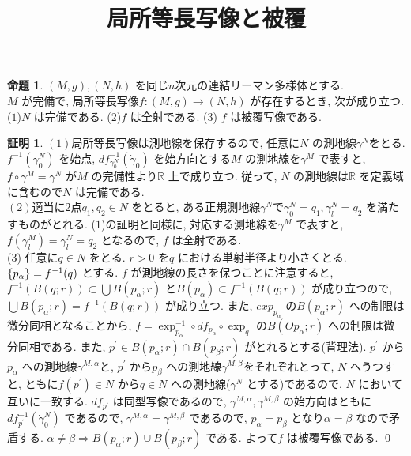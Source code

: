\documentclass[10pt, fleqn, label-section=none]{bxjsarticle}
\title{局所等長写像と被覆}
\date{}
\author{}
\theoremstyle{definition}
\newtheorem{prop}[dfn]{命題}
\newtheorem*{pf*}{証明}
\newcommand{\cbra}[1]{\mleft\{#1\mright\}}
\newcommand{\naraba}{\Rightarrow}
\renewcommand{\;}{\, ; \,}
\begin{document}
\maketitle

\maketitle


\section{}

\begin{prop}
$(M,g), (N,h)$ を同じ$n$次元の連結リーマン多様体とする. \\$M$ が完備で, 局所等長写像$f: (M,g) \rightarrow (N,h)$ が存在するとき, 次が成り立つ.\\
($1$)$N$ は完備である. \quad 
($2$)$f$ は全射である. \quad ($3$) $f$ は被覆写像である.
\end{prop}
\begin{pf*}
$(1)$局所等長写像は測地線を保存するので, 任意に$N$ の測地線$\gamma^N$をとる. $f^{-1}(\gamma^N_0)$ を始点, $df^{-1}_{\gamma^N_0} (\dot \gamma_0)$ を始方向とする$M$ の測地線を$\gamma^M$ で表すと, $f\circ \gamma^M = \gamma^N$ が$M$ の完備性より$\mathbb R$ 上で成り立つ. 従って, $N$ の測地線は$\mathbb R$ を定義域に含むので$N$ は完備である. \\
$(2)$適当に$2$点$q_1, q_2 \in N$ をとると, ある正規測地線$\gamma^N$で$\gamma^N_0 = q_1, \gamma^N_l = q_2$ を満たすものがとれる. ($1$)の証明と同様に, 対応する測地線を$\gamma^M$ で表すと, $f(\gamma^M_l) = \gamma^N_l = q_2$ となるので, $f$ は全射である. \\
($3$) 任意に$q \in N$ をとる. $r > 0$ を$q$ における単射半径より小さくとる. $\cbra{p_\alpha} = f^{-1}(q)$ とする. $f$ が測地線の長さを保つことに注意すると, $f^{-1} (B(q; r)) \subset \bigcup B(p_\alpha ; r)$ と$B(p_\alpha) \subset f^{-1} (B(q; r))$ が成り立つので, $\bigcup B(p_\alpha ; r) = f^{-1} (B(q; r))$ が成り立つ. また, $exp_{p_\alpha}$ の$B(p_\alpha ; r)$ への制限は微分同相となることから, $f = \exp_{p_\alpha}^{-1} \circ df_{p_\alpha}\circ \exp_q $ の$B(Op_\alpha ; r)$ への制限は微分同相である. また, $p^\prime \in B(p_\alpha ; r) \cap B(p_\beta ; r)$ がとれるとする(背理法). $p^\prime$ から$p_\alpha$ への測地線$\gamma^{M,\alpha}$と, $p^\prime$ から$p_\beta$ への測地線$\gamma^{M,\beta}$をそれぞれとって, $N$ へうつすと, ともに$f(p^\prime) \in N$ から$q \in N$ への測地線($\gamma^N$ とする)であるので, $N$ において互いに一致する. $df_{p^\prime}$ は同型写像であるので, $\gamma^{M,\alpha}, \gamma^{M,\beta}$ の始方向はともに$df_{p^\prime}^{-1}(\dot \gamma^N_0)$ であるので, $\gamma^{M,\alpha} = \gamma^{M,\beta}$ であるので, $p_\alpha = p_\beta$ となり$\alpha = \beta$ なので矛盾する.
$\alpha \neq \beta \naraba B(p_\alpha ; r) \cup B(p_\beta ; r) $ である. よって$f$ は被覆写像である. 
\qed
\end{pf*}
\end{document}
